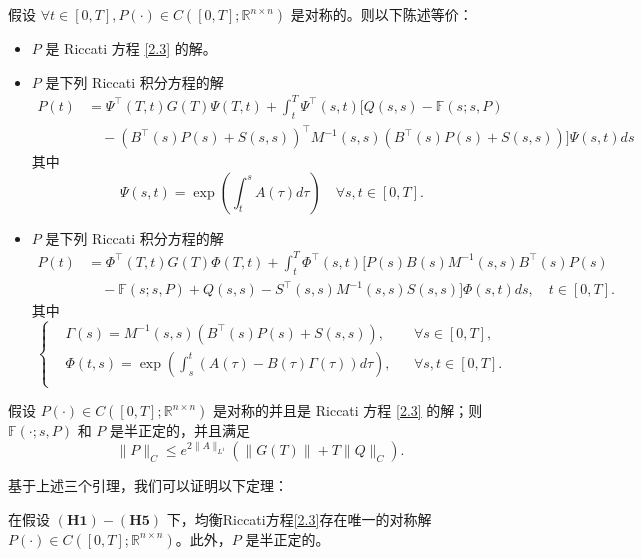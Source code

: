 \documentclass{GZUbachelorthesis}
\begin{document}
\begin{lem}\cite{cai2022time}\label{引理 4.3.}
	假设 $\forall t \in [0, T],P(\cdot) \in C([0, T]; \mathbb{R}^{n\times n})$ 是对称的。则以下陈述等价：
	\begin{itemize}
		\item[(i)] $P$ 是 Riccati 方程 \eqref{2.3} 的解。
		\item[(ii)] $P$ 是下列 Riccati 积分方程的解
		\begin{align*}
			P(t) &= \Psi^\top(T, t)G(T)\Psi(T, t) + \int_t^T \Psi^\top(s, t) \bigg[ Q(s, s) - \mathbb{F}(s; s, P) \\
			&\quad - \left( B^\top(s)P(s) + S(s, s) \right)^\top M^{-1}(s, s) \left( B^\top(s)P(s) + S(s, s) \right) \bigg] \Psi(s, t) ds
		\end{align*}
		其中
		\begin{equation*}
			\Psi(s, t) = \exp \left( \int_t^s A(\tau) d\tau \right) \quad \forall s, t \in [0, T].
		\end{equation*}
		\item[(iii)] $P$ 是下列 Riccati 积分方程的解
		\begin{align*}
			P(t) &= \Phi^\top(T, t)G(T)\Phi(T, t) + \int_t^T \Phi^\top(s, t) \bigg[ P(s)B(s)M^{-1}(s, s)B^\top(s)P(s) \\
			&\quad - \mathbb{F}(s; s, P) + Q(s, s) - S^\top(s, s)M^{-1}(s, s)S(s, s) \bigg] \Phi(s, t) ds, \quad t \in [0, T].
		\end{align*}
		其中
		\begin{equation*}
			\left\{
			\begin{aligned}
				&\Gamma(s)=M^{-1}(s,s)\left(B^\top(s)P(s)+S(s,s)\right), &&\forall s\in [0,T],\\[8pt]
				&\Phi(t,s)=\exp\left(\int_{s}^{t}\left(A(\tau)-B(\tau)\Gamma(\tau)\right)d\tau\right), &&\forall s,t\in [0,T].\\[8pt]
			\end{aligned}
			\right.
		\end{equation*}
	\end{itemize}
\end{lem}
\vspace{1em}
\begin{lem}\cite{cai2022time}\label{引理 4.4.}
	假设 $P(\cdot) \in C([0, T]; \mathbb{R}^{n\times n})$ 是对称的并且是 Riccati 方程 \eqref{2.3} 的解；则 $\mathbb{F}(\cdot; s, P)$ 和 $P$ 是半正定的，并且满足
	\begin{equation}\label{4.7}
		\|P\|_C \leq e^{2\|A\|_{L^1}} \left( \|G(T)\| + T\|Q\|_C \right).
	\end{equation}
\end{lem}
基于上述三个引理，我们可以证明以下定理：
\begin{thm}\label{thm3.2.1}
	在假设  $\mathbf{(H1)-(H5)}$ 下，均衡Riccati方程\eqref{2.3}存在唯一的对称解 $P(\cdot) \in C([0, T]; \mathbb{R}^{n\times n})$。此外，$P$ 是半正定的。
\end{thm}
\end{document}
